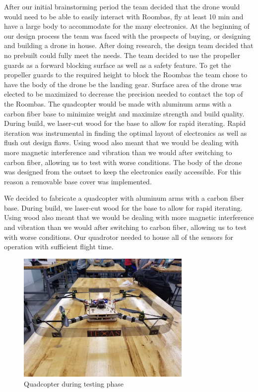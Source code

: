 \documentclass[12pt]{article}
\begin{document}
After our initial brainstorming period the team decided that the drone would would need to be able to easily interact with Roombas, fly at least 10 min and have a large body to accommodate for the many electronics. At the beginning of our design process the team was faced with the prospects of buying, or designing and building a drone in house. After doing research, the design team decided that no prebuilt could fully meet the needs. The team decided to use the propeller guards as a forward blocking surface as well as a safety feature. To get the propeller guards to the required height to block the Roombas the team chose to have the body of the drone be the landing gear. Surface area of the drone was elected to be maximized to decrease the precision needed to contact the top of the Roombas. The quadcopter would be made with aluminum arms with a carbon fiber base to minimize weight and maximize strength and build quality. During build, we laser-cut wood for the base to allow for rapid iterating. Rapid iteration was instrumental in finding the optimal layout of electronics as well as flush out design flaws. Using wood also meant that we would be dealing with more magnetic interference and vibration than we would after switching to carbon fiber, allowing us to test with worse conditions. The body of the drone was designed from the outset to keep the electronics easily accessible. For this reason a removable base cover was implemented. 

We decided to fabricate a quadcopter with aluminum arms with a carbon fiber base. During build, we laser-cut wood for the base to allow for rapid iterating. Using wood also meant that we would be dealing with more magnetic interference and vibration than we would after switching to carbon fiber, allowing us to test with worse conditions. Our quadrotor needed to house all of the sensors for operation with sufficient flight time. 

\begin{figure}[!htbp]
\begin{center}
\includegraphics[width=0.75\textwidth]{quad}
\caption*{Quadcopter during testing phase}
\end{center}
\end{figure}
\end{document}
